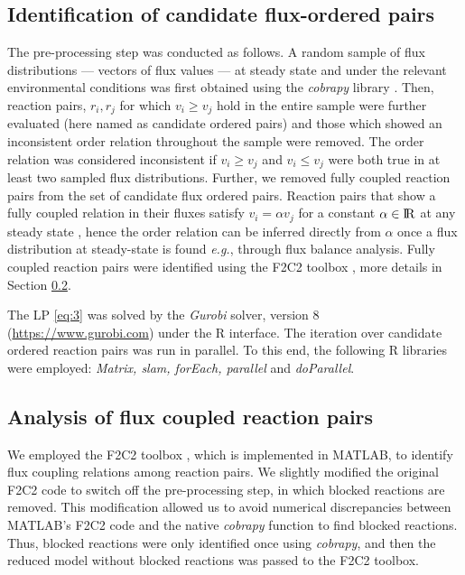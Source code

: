 \documentclass[12pt]{article}
\begin{document}
\subsection{Identification of candidate flux-ordered pairs}
The pre-processing step was conducted as follows. A random sample of flux distributions --- vectors of flux values --- at steady state and under the relevant environmental conditions was first obtained using the \emph{cobrapy} library \cite{Ebrahim2013}. Then, reaction pairs, $r_i, r_j$ for which $v_i \geq v_j$ hold in the entire sample were further evaluated (here named as candidate ordered pairs) and those which showed an inconsistent order relation throughout the sample were removed. The order relation was considered inconsistent if $v_i \geq v_j$ and $v_i\leq v_j$ were both true in at least two sampled flux distributions. Further, we removed fully coupled reaction pairs from the set of candidate flux ordered pairs. Reaction pairs that show a fully coupled relation in their fluxes satisfy $v_i = \alpha v_j$ for a constant $\alpha \in \rm I\!R$ at any steady state \cite{Burgard2004a}, hence the order relation can be inferred directly from $\alpha$ once a flux distribution at steady-state is found \emph{e.g.}, through flux balance analysis. Fully coupled reaction pairs were identified using the F2C2 toolbox \cite{Larhlimi2012}, more details in Section \ref{sec:f2c2}.

The LP \ref{eq:3} was solved by the \emph{Gurobi} solver, version 8 (\url{https://www.gurobi.com}) under the R interface. The iteration over candidate ordered reaction pairs was run in parallel. To this end, the following R libraries were employed: \emph{Matrix, slam, forEach, parallel} and \emph{doParallel}.

\subsection{Analysis of flux coupled reaction pairs}
\label{sec:f2c2}
We employed the F2C2 toolbox \cite{Larhlimi2012}, which is implemented in MATLAB, to identify flux coupling relations among reaction pairs. We slightly modified the original F2C2 code to switch off the pre-processing step, in which blocked reactions are removed. This modification allowed us to avoid numerical discrepancies between MATLAB's F2C2 code and the native \emph{cobrapy} function to find blocked reactions. Thus, blocked reactions were only identified once using \emph{cobrapy}, and then the reduced model without blocked reactions was passed to the F2C2 toolbox.
\end{document}
